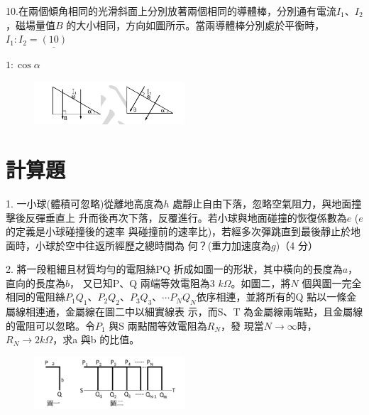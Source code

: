 \documentclass[cn,10pt,math=newtx]{elegantbook}
\begin{document}
\begin{example}
   10.在兩個傾角相同的光滑斜面上分別放著兩個相同的導體棒，分別通有電流$I_1、I_2$，磁場量值$B$
的大小相同，方向如圖所示。當兩導體棒分別處於平衡時，$I_1 : I_2 =\underline{(10)} $ \\
    \rightline{[全國聯招教甄109]}
\end{example}
\begin{solution}
    $1 : \cos{\alpha}$
\end{solution}
\begin{figure}[htbp]
    \flushright
    \includegraphics[width=0.5\textwidth]{image/109全國210.png}
  \end{figure}
\newpage

\section{計算題}


\begin{example}
  1. 一小球(體積可忽略)從離地高度為$h$ 處靜止自由下落，忽略空氣阻力，與地面撞擊後反彈垂直上
升而後再次下落，反覆進行。若小球與地面碰撞的恢復係數為$e$ ($e$的定義是小球碰撞後的速率
與碰撞前的速率比)，若經多次彈跳直到最後靜止於地面時，小球於空中往返所經歷之總時間為
何？(重力加速度為$g$)（4 分） \\
    \rightline{[全國聯招教甄109]}
\end{example}
\begin{solution}
    
\end{solution}

\newpage



\begin{example}
  2. 將一段粗細且材質均勻的電阻絲PQ 折成如圖一的形狀，其中橫向的長度為$a$，直向的長度為$b$，
又已知P、Q 兩端等效電阻為3 $k \Omega$。如圖二，將$N$ 個與圖一完全相同的電阻絲$P_1Q_1、P_2Q_2、
P_3Q_3、\cdots P_NQ_N$依序相連，並將所有的Q 點以一條金屬線相連通，金屬線在圖二中以細實線表
示，而S、T 為金屬線兩端點，且金屬線的電阻可以忽略。令$P_1$ 與S 兩點間等效電阻為$R_N$，發
現當$N\rightarrow \infty$時，$R_N\rightarrow 2 k\Omega$，求a 與b 的比值。 \\
    \rightline{[全國聯招教甄109]}
\end{example}
\begin{solution}
    
\end{solution}
\begin{figure}[htbp]
    \flushright
    \includegraphics[width=0.5\textwidth]{image/109全國32.png}
  \end{figure}
\newpage
\end{document}
